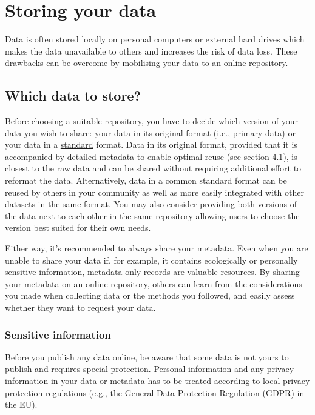 \documentclass[
]{book}
\begin{document}
\hypertarget{storing-your-data}{%
\chapter{Storing your data}\label{storing-your-data}}

Data is often stored locally on personal computers or external hard drives which makes the data unavailable to others and increases the risk of data loss. These drawbacks can be overcome by \protect\hyperlink{mobilisation}{mobilising} your data to an online repository.

\hypertarget{which-data-to-store}{%
\section{Which data to store?}\label{which-data-to-store}}

Before choosing a suitable repository, you have to decide which version of your data you wish to share: your data in its original format (i.e., primary data) or your data in a \protect\hyperlink{standardise}{standard} format. Data in its original format, provided that it is accompanied by detailed \protect\hyperlink{metadata}{metadata} to enable optimal reuse (see section \protect\hyperlink{describe-data}{4.1}), is closest to the raw data and can be shared without requiring additional effort to reformat the data. Alternatively, data in a common standard format can be reused by others in your community as well as more easily integrated with other datasets in the same format. You may also consider providing both versions of the data next to each other in the same repository allowing users to choose the version best suited for their own needs.

Either way, it's recommended to always share your metadata. Even when you are unable to share your data if, for example, it contains ecologically or personally sensitive information, metadata-only records are valuable resources. By sharing your metadata on an online repository, others can learn from the considerations you made when collecting data or the methods you followed, and easily assess whether they want to request your data.

\hypertarget{sensitive-information}{%
\subsection{Sensitive information}\label{sensitive-information}}

Before you publish any data online, be aware that some data is not yours to publish and requires special protection. Personal information and any privacy information in your data or metadata has to be treated according to local privacy protection regulations (e.g., the \href{https://commission.europa.eu/law/law-topic/data-protection/data-protection-eu_en}{General Data Protection Regulation (GDPR)} in the EU).
\end{document}
